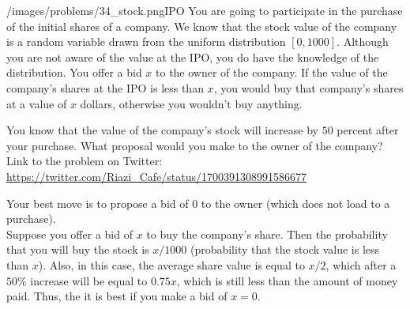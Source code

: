 \begin{problem}{/images/problems/34_stock.png}{IPO}
    You are going to participate in the purchase of the initial shares of a company. We know that the stock value of the company is a random variable drawn from the uniform distribution $[0,1000]$. Although you are not aware of the value at the IPO, you do have the knowledge of the distribution. You offer a bid $x$ to the owner of the company. If the value of the company's shares at the IPO is less than $x$, you would buy that company's shares at a value of $x$ dollars, otherwise you wouldn't buy anything.

You know that the value of the company's stock will increase by $50$ percent after your purchase. What proposal would you make to the owner of the company?\\[0.2cm]

Link to the problem on Twitter:  \url{https://twitter.com/Riazi_Cafe/status/1700391308991586677}
\end{problem}
\begin{solution}
Your best move is to propose a bid of $0$ to the owner (which does not load to a purchase).\\[0.2cm]
	
Suppose you offer a bid of $x$ to buy the company's share. Then the probability that you will buy the stock is $x/1000$ (probability that the stock value is  less than $x$). Also, in this case, the average share value is equal to $x/2$, which after a $50\%$ increase will be equal to $0.75x$, which is still less than the amount of money paid. Thus, the it is best if you make a bid of $x=0$.

\end{solution}